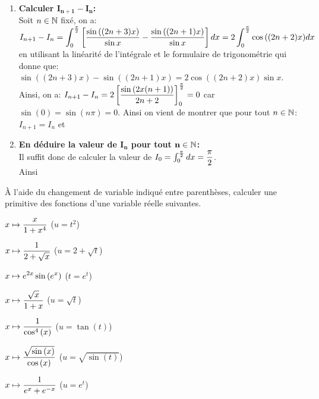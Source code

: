 \documentclass[a4paper, 11pt,reqno]{article}
\begin{document}
\begin{correction}
\begin{enumerate}
\begin{enumerate}
			      \item \textbf{Calculer $\mathbf{I_{n+1}-I_n}$:}\\
			            \noindent Soit $n\in\mathbb{N}$ fix\'e, on a: $I_{n+1}-I_n=\displaystyle\int_0^{\frac{\pi}{2}}\left\lbrack \displaystyle\frac{\sin{((2n+3)x)}}{\sin{x}}-\displaystyle\frac{\sin{((2n+1)x)}}{\sin{x}}\right\rbrack dx=2\int_0^{\frac{\pi}{2}} \cos{((2n+2)x)}dx$ en utilisant la lin\'earit\'e de l'int\'egrale et le formulaire de trigonom\'etrie qui donne que: $\sin{((2n+3)x)}-\sin{((2n+1)x)}=2 \cos{((2n+2)x)} \sin{x}$. Ainsi, on a: $I_{n+1}-I_n=2\left\lbrack \displaystyle\frac{\sin{(2x(n+1))}}{2n+2}   \right\rbrack_0^{\frac{\pi}{2}}=0$ car $\sin{(0)}=\sin{(n\pi)}=0$. Ainsi on vient de montrer que pour tout $n\in\mathbb{N}$: $I_{n+1}=I_n$ et 
			      \item \textbf{En d\'eduire la valeur de $\mathbf{I_n}$ pour tout $\mathbf{n\in \mathbb{N}}$:}\\
			            \noindent Il suffit donc de calculer la valeur de $I_0=\int_0^{\frac{\pi}{2}} dx=\displaystyle\frac{\pi}{2}$.\\
			            \noindent Ainsi 
		      \end{enumerate}
	\end{enumerate}
\end{correction}

\begin{exercice}   \;
	\`{A} l'aide du changement de variable indiqu\'e entre parenth\`eses, calculer une primitive des fonctions d'une variable r\'eelle suivantes.\\
	\begin{enumerate}
		\begin{minipage}[t]{0.45\textwidth}
			\item $\displaystyle x\mapsto \displaystyle\frac{x}{1+x^4}$ \; ($u=t^2$)
			\item $\displaystyle x\mapsto \displaystyle\frac{1}{2+\sqrt{x}}$ \; ($u=2+\sqrt{t}$)
			\item $\displaystyle x\mapsto e^{2x}\sin{(e^x)}$ \; ($t=e^t$)
			\item $\displaystyle x\mapsto \displaystyle\frac{\sqrt{x}}{ 1+x}$ \; ($u=\sqrt{t}$)
		\end{minipage}
		\begin{minipage}[t]{0.45\textwidth}
			\item $\displaystyle x\mapsto \displaystyle\frac{1}{\cos^4{(x)}}$ \; ($u=\tan{(t)}$)
			\item $\displaystyle x\mapsto \displaystyle\frac{\sqrt{\sin{(x)}}}{\cos{(x)}}$ \; ($u=\sqrt{\sin{(t)}}$)
			\item $\displaystyle x\mapsto \displaystyle\frac{1}{e^x+e^{-x}}$ \; ($u=e^t$)
		\end{minipage}
	\end{enumerate}
\end{exercice}
\end{document}
